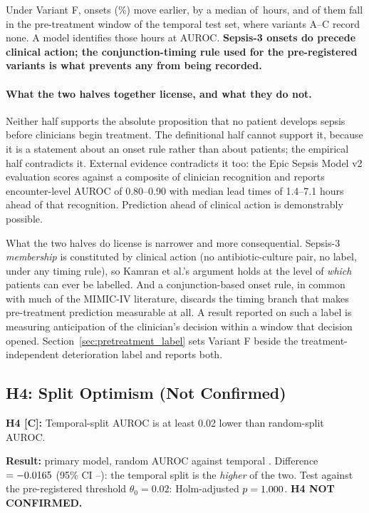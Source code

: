 Under Variant F, \pcFNMovedEarlier{} onsets (\pcFPctMovedEarlier\%) move
earlier, by a median of \pcFMedianShiftH\,hours, and
\pcPreTreatOnsetsVarF{} of them fall in the pre-treatment window of the temporal
test set, where variants A--C record none. A model identifies those hours at
\pcPreTreatAurocPrimaryF{} AUROC. \textbf{Sepsis-3 onsets do precede clinical
action; the conjunction-timing rule used for the pre-registered variants is what
prevents any from being recorded.}

\paragraph{What the two halves together license, and what they do not.}
Neither half supports the absolute proposition that no patient develops sepsis
before clinicians begin treatment. The definitional half cannot support it,
because it is a statement about an onset rule rather than about patients; the
empirical half contradicts it. External evidence contradicts it too: the Epic
Sepsis Model v2 evaluation \cite{wong2026epic} scores against a composite of
clinician recognition and reports encounter-level AUROC of 0.80--0.90 with
median lead times of 1.4--7.1 hours ahead of that recognition. Prediction ahead
of clinical action is demonstrably possible.

What the two halves do license is narrower and more consequential. Sepsis-3
\emph{membership} is constituted by clinical action (no antibiotic-culture
pair, no label, under any timing rule), so Kamran et al.'s
\cite{kamran2024evaluation} argument holds at the level of \emph{which} patients
can ever be labelled. And a conjunction-based onset rule, in common with much of
the MIMIC-IV literature, discards the timing branch that makes pre-treatment
prediction measurable at all. A result reported on such a label is measuring
anticipation of the clinician's decision within a window that decision opened.
Section~\ref{sec:pretreatment_label} sets Variant F beside the
treatment-independent deterioration label and reports both.

\subsection{H4: Split Optimism (Not Confirmed)}
\label{sec:h4_discussion}

\begin{mdframed}[backgroundcolor=ATUOrange!20, linecolor=ATUOrange]
    \textbf{H4 [C]:} Temporal-split AUROC is at least 0.02 lower than
    random-split AUROC.

    \textbf{Result:} primary model, random AUROC \pcAurocRandomPrimaryB{}
    against temporal \pcAurocPrimaryB. Difference $= -0.0165$ (95\% CI
    \pcHFourCiLo--\pcHFourCiHi): the temporal split is the \emph{higher} of
    the two. Test against the pre-registered threshold $\theta_0 = 0.02$:
    Holm-adjusted $p = 1.000$. \textbf{H4 NOT CONFIRMED.}
\end{mdframed}

